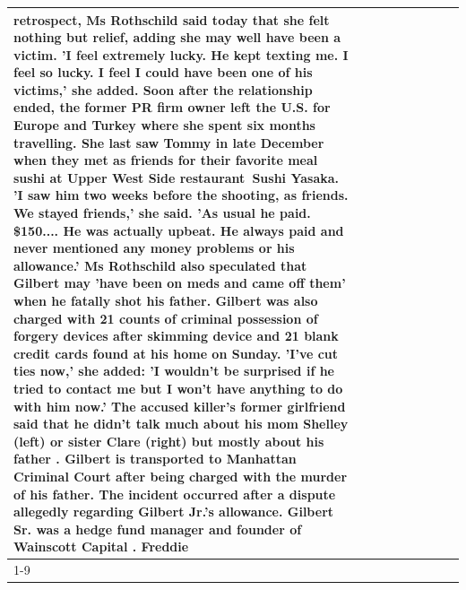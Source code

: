 \begin{table}[H]
\begin{tabular}{lllrlllll}
retrospect, Ms Rothschild said today that she felt nothing but relief, adding she may well have been a victim. 'I feel extremely lucky. He kept texting me. I feel so lucky. I feel I could have been one of his victims,' she added. Soon after the relationship ended, the former PR firm owner left the U.S. for Europe and Turkey where she spent six months  travelling. She last saw Tommy in late December when they met as friends for their favorite meal sushi at Upper West Side restaurant Sushi Yasaka. 'I saw him two weeks before the shooting, as friends. We stayed friends,' she said. 'As usual he paid. \$150.... He was actually upbeat. He always paid and never mentioned any money problems or his allowance.' Ms Rothschild also speculated that Gilbert may 'have been on meds and came off them' when he fatally shot his father. Gilbert was also charged with 21 counts of criminal possession of forgery devices after skimming device and 21 blank credit cards found at his home on Sunday. 'I've cut ties now,' she added: 'I wouldn’t be surprised if he tried to contact me but I won’t have anything to do with him now.' The accused killer's former girlfriend said that he didn't talk much about his mom Shelley (left) or sister Clare (right) but mostly about his father . Gilbert is transported to Manhattan Criminal Court  after being charged with the murder of his father. The incident occurred after a dispute allegedly regarding Gilbert Jr.'s allowance. Gilbert Sr. was a hedge fund manager and founder of Wainscott Capital . Freddie \\
\cline{1-9}

\end{tabular}
\end{table}
